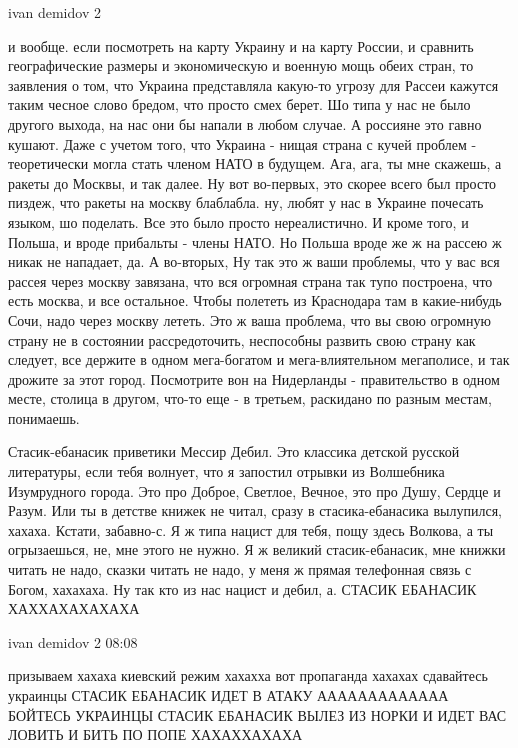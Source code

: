 ivan demidov 2

и вообще. если посмотреть на карту Украину и на карту России, и сравнить
географические размеры и экономическую и военную мощь обеих стран, то заявления
о том, что Украина представляла какую-то угрозу для Рассеи кажутся таким чесное
слово бредом, что просто смех берет. Шо типа у нас не было другого выхода, на
нас они бы напали в любом случае. А россияне это гавно кушают. Даже с учетом
того, что Украина - нищая страна с кучей проблем - теоретически могла стать
членом НАТО в будущем. Ага, ага, ты мне скажешь, а ракеты до Москвы, и так
далее. Ну вот во-первых, это скорее всего был просто пиздеж, что ракеты на
москву блаблабла. ну, любят у нас в Украине почесать языком, шо поделать. Все
это было просто нереалистично. И кроме того, и Польша, и вроде прибальты -
члены НАТО. Но Польша вроде же ж на рассею ж никак не нападает, да. А
во-вторых, Ну так это ж ваши проблемы, что у вас вся рассея через москву
завязана, что вся огромная страна так тупо построена, что есть москва, и все
остальное. Чтобы полететь из Краснодара там в какие-нибудь Сочи, надо через
москву лететь. Это ж ваша проблема, что вы свою огромную страну не в состоянии
рассредоточить, неспособны развить свою страну как следует, все держите в одном
мега-богатом и мега-влиятельном мегаполисе, и так дрожите за этот город.
Посмотрите вон на Нидерланды - правительство в одном месте, столица в другом,
что-то еще - в третьем, раскидано по разным местам, понимаешь.

Стасик-ебанасик приветики Мессир Дебил. Это классика детской русской
литературы, если тебя волнует, что я запостил отрывки из Волшебника Изумрудного
города. Это про Доброе, Светлое, Вечное, это про Душу, Сердце и Разум. Или ты в
детстве книжек не читал, сразу в стасика-ебанасика вылупился, хахаха. Кстати,
забавно-с. Я ж типа нацист для тебя, пощу здесь Волкова, а ты огрызаешься, не,
мне этого не нужно. Я ж великий стасик-ебанасик, мне книжки читать не надо,
сказки читать не надо, у меня ж прямая телефонная связь с Богом, хахахаха. Ну
так кто из нас нацист и дебил, а. СТАСИК ЕБАНАСИК ХАХХАХАХАХАХА

ivan demidov 2
08:08

призываем хахаха киевский режим хахахха вот пропаганда хахахах сдавайтесь
украинцы СТАСИК ЕБАНАСИК ИДЕТ В АТАКУ ААААААААААААА БОЙТЕСЬ УКРАИНЦЫ СТАСИК
ЕБАНАСИК ВЫЛЕЗ ИЗ НОРКИ И ИДЕТ ВАС ЛОВИТЬ И БИТЬ ПО ПОПЕ ХАХАХХАХАХА

